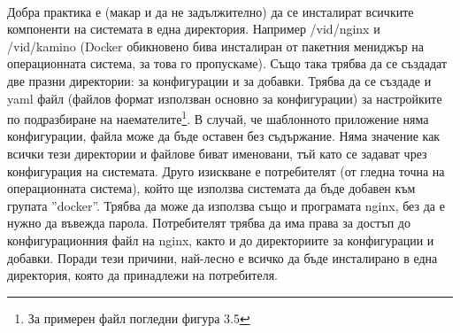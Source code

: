 \documentclass[pdftex,14pt,a4paper]{extreport}
\begin{document}
\paragraph {}
Добра практика е (макар и да не задължително) да се инсталират всичките компоненти на системата в една директория. Например /vid/nginx и /vid/kamino (Docker обикновено бива инсталиран от пакетния мениджър на операционната система, за това го пропускаме). Също така трябва да се създадат две празни директории: за конфигурации и за добавки. Трябва да се създаде и yaml файл (файлов формат използван основно за конфигурации) за настройките по подразбиране на наемателите\footnote{За примерен файл погледни фигура 3.5}. В случай, че шаблонното приложение няма конфигурации, файла може да бъде оставен без съдържание. Няма значение как всички тези директории и файлове биват именовани, тъй като се задават чрез конфигурация на системата. Друго изискване е потребителят (от гледна точна на операционната система), който ще използва системата да бъде добавен към групата ''docker''. Трябва да може да използва също и програмата nginx, без да е нужно да въвежда парола. Потребителят трябва да има права за достъп до конфигурационния файл на nginx, както и до директориите за конфигурации и добавки. Поради тези причини, най-лесно е всичко да бъде инсталирано в една директория, която да принадлежи на потребителя.
\end{document}
